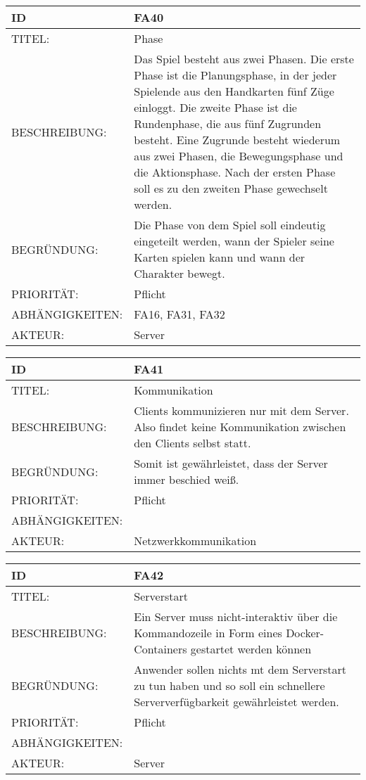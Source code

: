 \documentclass{uulm-assignment}
\begin{document}
    \begin{tabularx}{\textwidth}{|l|X |} \hline
        \textbf{ID} & \textbf{FA40} \\
        \hline
        TITEL: & Phase\\
        \hline
        BESCHREIBUNG: & Das Spiel besteht aus zwei Phasen. Die erste Phase
ist die Planungsphase, in der jeder Spielende aus den Handkarten fünf Züge einloggt. Die zweite
Phase ist die Rundenphase, die aus fünf Zugrunden besteht. Eine Zugrunde besteht wiederum aus
zwei Phasen, die Bewegungsphase und die Aktionsphase. Nach der ersten Phase soll es zu den zweiten Phase gewechselt werden.
        \\
        \hline
        BEGRÜNDUNG: & Die Phase von dem Spiel soll eindeutig eingeteilt werden, wann der Spieler seine Karten spielen kann und wann der Charakter bewegt. \\
        \hline
        PRIORITÄT: & Pflicht\\
        \hline
        ABHÄNGIGKEITEN: & FA16, FA31, FA32 \\
        \hline
        AKTEUR: & Server\\
        \hline
    \end{tabularx}
    
    \begin{tabularx}{\textwidth}{|l|X |} \hline
        \textbf{ID} & \textbf{FA41} \\
        \hline
        TITEL: & Kommunikation \\
        \hline
        BESCHREIBUNG: & Clients kommunizieren nur mit dem Server. Also findet keine Kommunikation zwischen den Clients selbst statt. \\
        \hline
        BEGRÜNDUNG: & Somit ist gewährleistet, dass der Server immer beschied weiß. \\
        \hline
        PRIORITÄT: & Pflicht\\
        \hline
        ABHÄNGIGKEITEN: & \\
        \hline
        AKTEUR: & Netzwerkkommunikation\\
        \hline
    \end{tabularx}
    
    \begin{tabularx}{\textwidth}{|l|X |} \hline
        \textbf{ID} & \textbf{FA42} \\
        \hline
        TITEL: &  Serverstart\\
        \hline
        BESCHREIBUNG: &  Ein Server muss nicht-interaktiv über die Kommandozeile in Form eines Docker-
Containers gestartet werden können \\
        \hline
        BEGRÜNDUNG: &  Anwender sollen nichts mt dem Serverstart zu tun haben und so soll ein schnellere Serververfügbarkeit gewährleistet werden.\\
        \hline
        PRIORITÄT: & Pflicht\\
        \hline
        ABHÄNGIGKEITEN: & \\
        \hline
        AKTEUR: & Server\\
        \hline
    \end{tabularx}
    
\end{document}
